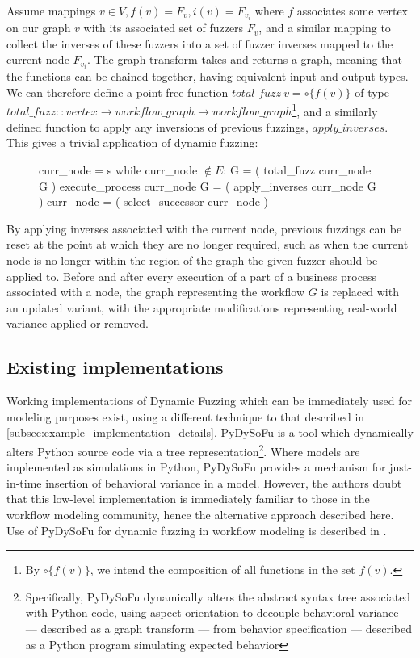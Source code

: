 \documentclass[draft,12pt]{llncs}  %
\begin{document}
Assume mappings \(v \in V, f(v)=F_v, i(v)=F_{v_i}\) where $f$ associates some
vertex on our graph $v$ with its associated set of fuzzers $F_v$, and a similar
mapping to collect the inverses of these fuzzers into a set of fuzzer inverses
mapped to the current node $F_{v_i}$. The graph transform takes and returns a
graph, meaning that the functions can be chained together, having equivalent
input and output types. We can therefore define a point-free function
$total\_fuzz~v = \circ\{f(v)\}$ of type $total\_fuzz :: vertex \rightarrow
workflow\_graph \rightarrow workflow\_graph$\footnote{By $\circ\{f(v)\}$, we
  intend the composition of all functions in the set $f(v)$.}, and a similarly
defined function to apply any inversions of previous fuzzings,
$apply\_inverses$. This gives a trivial application of dynamic fuzzing:

\begin{figure}[H]
  \begin{algorithm}
    curr_node = s
    while curr_node $\notin{} E$:
        G = ( total_fuzz curr_node G )
        execute_process
        curr_node G = ( apply_inverses curr_node G )
        curr_node = ( select_successor curr_node )
  \end{algorithm}
\end{figure}
By applying inverses associated with the current node, previous fuzzings can be
reset at the point at which they are no longer required, such as when the
current node is no longer within the region of the graph the given fuzzer should
be applied to. Before and after every execution of a part of a business process
associated with a node, the graph representing the workflow $G$ is replaced with
an updated variant, with the appropriate modifications representing real-world
variance applied or removed.
\par

\subsection{Existing implementations}
Working implementations of Dynamic Fuzzing which can be immediately used for
modeling purposes exist, using a different technique to that described in
\cref{subsec:example_implementation_details}. PyDySoFu\citep{pdsf} is a tool
which dynamically alters Python source code via a tree
representation\footnote{Specifically, PyDySoFu dynamically alters the abstract
  syntax tree associated with Python code, using aspect orientation to decouple
  behavioral variance --- described as a graph transform --- from behavior
  specification --- described as a Python program simulating expected
  behavior}. Where models are implemented as simulations in Python, PyDySoFu
provides a mechanism for just-in-time insertion of behavioral variance in a
model. However, the authors doubt that this low-level implementation is
immediately familiar to those in the workflow modeling community, hence the
alternative approach described here. Use of PyDySoFu for dynamic fuzzing in
workflow modeling is described in \cite{wallis2018modelling}.
\par
\end{document}
